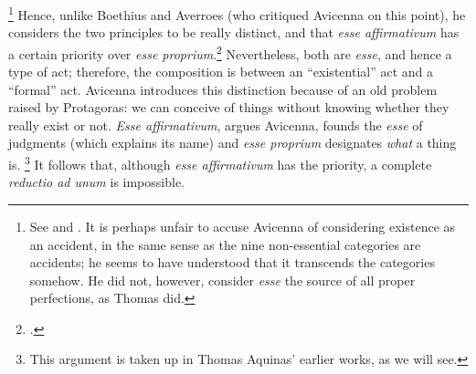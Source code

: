 \footnote{See \cite[190-192]{gilson:history} and \cite[68]{gilson:letre}. It is perhaps unfair to accuse Avicenna of considering existence as an accident, in the same sense as the nine non-essential categories are accidents; he seems to have understood that it transcends the categories somehow. He did not, however, consider \emph{esse} the source of all proper perfections, as Thomas did.} Hence, unlike Boethius and Averroes (who critiqued Avicenna on this point), he considers the two principles to be really distinct, and that \emph{esse affirmativum} has a certain priority over \emph{esse proprium}.\footcite[See][191]{gilson:history} Nevertheless, both are \emph{esse}, and hence a type of act; therefore, the composition is between an ``existential'' act and a ``formal'' act. Avicenna introduces this distinction because of an old problem raised by Protagoras: we can conceive of things without knowing whether they really exist or not. \emph{Esse affirmativum}, argues Avicenna, founds the \emph{esse} of judgments (which explains its name) and \emph{esse proprium} designates \emph{what} a thing is.%
%
\footnote{This argument is taken up in Thomas Aquinas' earlier works, as we will see.} It follows that, although \emph{esse affirmativum} has the priority, a complete \emph{reductio ad unum} is impossible.

